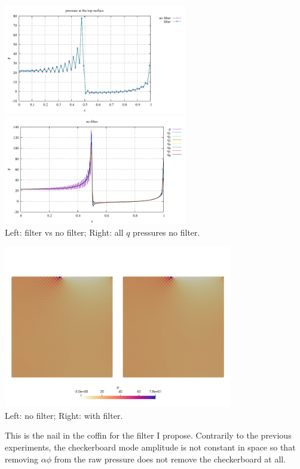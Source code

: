 \begin{center}
\includegraphics[width=8cm]{python_codes/fieldstone_12/results/punch/p_top.pdf}
\includegraphics[width=8cm]{python_codes/fieldstone_12/results/punch/p_top_all.pdf}\\
{\captionfont Left: filter vs no filter; Right: all $q$ pressures no filter.}
\end{center}

\begin{center}
\includegraphics[width=10cm]{python_codes/fieldstone_12/results/punch/pressures}\\
{\captionfont Left: no filter; Right: with filter.}
\end{center}

This is the nail in the coffin for the filter I propose.
Contrarily to the previous experiments, the checkerboard mode 
amplitude is not constant in space so that removing $\alpha \phi$
from the raw pressure does not remove the checkerboard at all. 










